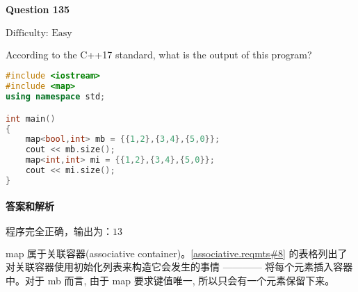 \documentclass{article}
\begin{document}
	\paragraph*{Question 135} $\boxed{\text{Difficulty: Easy}} $			
	
	According to the C++17 standard, what is the output of this program?
	
	\begin{lstlisting}[language=C++]  		
#include <iostream>
#include <map>
using namespace std;

int main()
{
	map<bool,int> mb = {{1,2},{3,4},{5,0}};
	cout << mb.size(); 
	map<int,int> mi = {{1,2},{3,4},{5,0}};
	cout << mi.size();
}
	\end{lstlisting}
	
	\paragraph*{答案和解析} $\boxed{\text{程序完全正确，输出为：13}} $
	
	map 属于关联容器(associative container)。\href{https://timsong-cpp.github.io/cppwp/n4659/associative.reqmts#8}{[associative.reqmts\#8]} 的表格列出了对关联容器使用初始化列表来构造它会发生的事情 ———— 将每个元素插入容器中。对于 mb 而言, 由于 map 要求键值唯一, 所以只会有一个元素保留下来。
	
\end{document}
